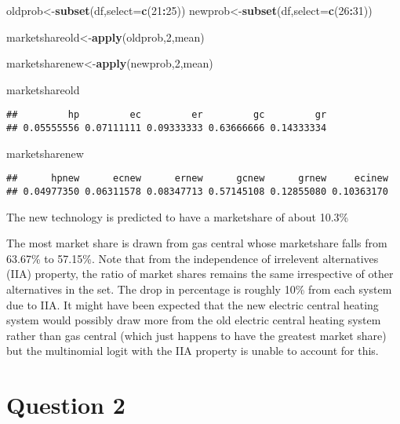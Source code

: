 \documentclass[
]{article}
\newenvironment{Shaded}{\begin{snugshade}}{\end{snugshade}}
\newcommand{\DataTypeTok}[1]{\textcolor[rgb]{0.13,0.29,0.53}{#1}}
\newcommand{\DecValTok}[1]{\textcolor[rgb]{0.00,0.00,0.81}{#1}}
\newcommand{\KeywordTok}[1]{\textcolor[rgb]{0.13,0.29,0.53}{\textbf{#1}}}
\newcommand{\NormalTok}[1]{#1}
\newcommand{\OperatorTok}[1]{\textcolor[rgb]{0.81,0.36,0.00}{\textbf{#1}}}
\begin{document}
\begin{Shaded}
\begin{Highlighting}[]
\NormalTok{oldprob<-}\KeywordTok{subset}\NormalTok{(df,}\DataTypeTok{select=}\KeywordTok{c}\NormalTok{(}\DecValTok{21}\OperatorTok{:}\DecValTok{25}\NormalTok{))}
\NormalTok{newprob<-}\KeywordTok{subset}\NormalTok{(df,}\DataTypeTok{select=}\KeywordTok{c}\NormalTok{(}\DecValTok{26}\OperatorTok{:}\DecValTok{31}\NormalTok{))}


\NormalTok{marketshareold<-}\KeywordTok{apply}\NormalTok{(oldprob,}\DecValTok{2}\NormalTok{,mean)}


\NormalTok{marketsharenew<-}\KeywordTok{apply}\NormalTok{(newprob,}\DecValTok{2}\NormalTok{,mean)}


\NormalTok{marketshareold}
\end{Highlighting}
\end{Shaded}

\begin{verbatim}
##         hp         ec         er         gc         gr 
## 0.05555556 0.07111111 0.09333333 0.63666666 0.14333334
\end{verbatim}

\begin{Shaded}
\begin{Highlighting}[]
\NormalTok{marketsharenew}
\end{Highlighting}
\end{Shaded}

\begin{verbatim}
##      hpnew      ecnew      ernew      gcnew      grnew     ecinew 
## 0.04977350 0.06311578 0.08347713 0.57145108 0.12855080 0.10363170
\end{verbatim}

\pagebreak

The new technology is predicted to have a marketshare of about 10.3\%

The most market share is drawn from gas central whose marketshare falls
from 63.67\% to 57.15\%. Note that from the independence of irrelevent
alternatives (IIA) property, the ratio of market shares remains the same
irrespective of other alternatives in the set. The drop in percentage is
roughly 10\% from each system due to IIA. It might have been expected
that the new electric central heating system would possibly draw more
from the old electric central heating system rather than gas central
(which just happens to have the greatest market share) but the
multinomial logit with the IIA property is unable to account for this.

\pagebreak

\hypertarget{question-2}{%
\section{Question 2}\label{question-2}}
\end{document}

